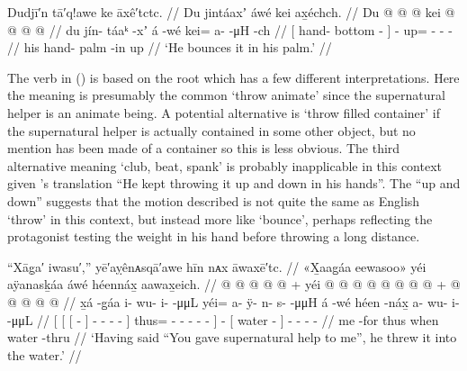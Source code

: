 \ex\label{ex:90-30-bounce-in-hand}%
%
\begingl
	\glpreamble	Dudjī′n tā′q!awe ke āxê′tctc. //
	\glpreamble	Du jintáaxʼ áwé kei ax̱échch. //
	\gla	{} Du  @ {} @ {} {}
		 @ {}
		kei @  @ {} @ {} @ {} //
	\glb	{} du jín- táaᵏ -xʼ {}
		á -wé
		kei= a-  -μH -ch //
	\glc	{}[  hand- bottom - {}]
		 -
		up= -  - - //
	\gld	{} his hand- palm -in {}
		 {}
		up  {} {} {} //
	\glft	‘He bounces it in his palm.’
		//
\endgl
\xe

The verb in (\lastx) is based on the root  which has a few different interpretations.
Here the meaning is presumably the common ‘throw animate’ since the supernatural helper is an animate being.
A potential alternative is ‘throw filled container’ if the supernatural helper is actually contained in some other object, but no mention has been made of a container so this is less obvious.
The third alternative meaning ‘club, beat, spank’ is probably inapplicable in this context given \citeauthor{swanton:1909}’s translation “He kept throwing it up and down in his hands”.
The “up and down” suggests that the motion described is not quite the same as English ‘throw’ in this context, but instead more like ‘bounce’, perhaps reflecting the protagonist testing the weight in his hand before throwing a long distance.

\ex\label{ex:90-31-came-help-saying-threw}%
%
\begingl
	\glpreamble	“Xāg̣a′ iwasu′,” yē′aỵênᴀsqā′awe hīn nᴀx āwaxē′tc. //
	\glpreamble	«\!X̱aag̱áa eewasoo\!» yéi aÿanasḵáa áwé héennáx̱ aawax̱eich. //
	\gla	{} {} {}  @ {} {}
				 @ {} @ {} @ {} @ {} {} +
			yéi @  @ {} @ {} @ {} @ {} @ {} @ {} {}
		 @ {} +
		{}  @ {} {}
		 @ {} @ {} @ {} @ {} //
	\glb	{} {} {} x̱á -g̱áa {}
				i- wu- i-  -μμL {}
			yéi= a- ÿ- n- s-  -μμH {} {}
		á -wé
		{} héen -náx̱ {}
		a- wu- i-  -μμL //
	\glc	{}[\pr{CP} {}[ {}[  - {}]
				- - -  - {}]
			thus= - - - -  - \· {}]
		 -
		{}[ water - {}]
		- - -  - //
	\gld	{} {} {} me -for {}
				 {} {} {} {} {}
			thus  {} {} {} {} {} \·when {}
		 {}
		{} water -thru {}
		 {} {} {} {} //
	\glft	‘Having said “You gave supernatural help to me”, he threw it into the water.’
		//
\endgl
\xe

